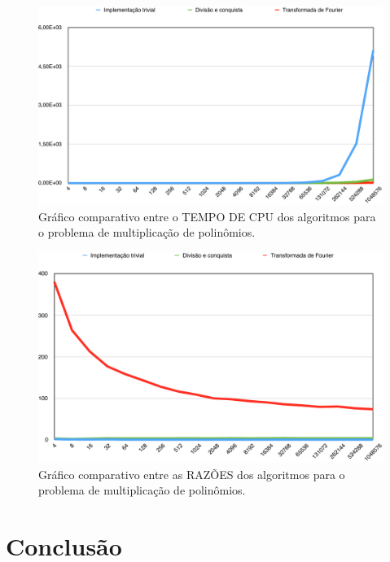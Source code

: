 \documentclass[
	12pt,				%
	oneside,			%
	a4paper,			%
	english,			%
	french,				%
	spanish,			%
	brazil,				%
	]{abntex2}
\begin{document}
\begin{figure}[H]
 \centering
 \includegraphics[width=6.4in]{charts/mult_time.pdf}
 \caption{Gráfico comparativo entre o TEMPO DE CPU dos algoritmos para o problema de multiplicação de polinômios.}
 \label{fig:AlutGraphTimeAll}
\end{figure}

\begin{figure}[H]
 \centering
 \includegraphics[width=6.4in]{charts/mult_raz.pdf}
 \caption{Gráfico comparativo entre as RAZÕES dos algoritmos para o problema de multiplicação de polinômios.}
 \label{fig:AlutGraphTimeAll}
\end{figure}


% 

\chapter*[Conclusão]{Conclusão}
\end{document}
